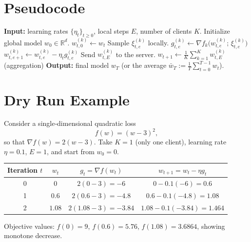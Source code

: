 \documentclass[11pt]{article}
\newcommand{\R}{\mathbb{R}}
\begin{document}
\section*{Pseudocode}
\begin{algorithm}[H]
\caption{Federated Averaging with $E$ Local SGD Steps}
\begin{algorithmic}[1]
\STATE \textbf{Input:} learning rates $\{\eta_t\}_{t\ge 0}$, local steps $E$, number of clients $K$.
\STATE Initialize global model $w_0\in\R^d$.
        \STATE $w_{t,0}^{(k)} \gets w_t$
            \STATE Sample $\xi_{t,e}^{(k)}$ locally.
            \STATE $g_{t,e}^{(k)} \gets \nabla f_k\big(w_{t,e}^{(k)};\,\xi_{t,e}^{(k)}\big)$
            \STATE $w_{t,e+1}^{(k)} \gets w_{t,e}^{(k)} - \eta_t g_{t,e}^{(k)}$
        \ENDFOR
        \STATE Send $w_{t,E}^{(k)}$ to the server.
    \ENDFOR
    \STATE $w_{t+1} \gets \frac{1}{K}\sum_{k=1}^{K} w_{t,E}^{(k)}$   \hfill (aggregation)
\ENDFOR
\STATE \textbf{Output:} final model $w_T$ (or the average $\bar w_T:=\frac1T\sum_{t=0}^{T-1}w_t$).
\end{algorithmic}
\end{algorithm}

\section*{Dry Run Example}
Consider a single‑dimensional quadratic loss
\[
f(w) = (w-3)^2 ,
\]
so that $\nabla f(w)=2(w-3)$.  
Take $K=1$ (only one client), learning rate $\eta=0.1$, $E=1$, and start from $w_0=0$.

\medskip
\begin{tabular}{c|c|c|c}
\textbf{Iteration $t$} & $w_t$ & $g_t=\nabla f(w_t)$ & $w_{t+1}=w_t-\eta g_t$ \\ \hline
0 & $0$ & $2(0-3)=-6$ & $0-0.1(-6)=0.6$ \\
1 & $0.6$ & $2(0.6-3)=-4.8$ & $0.6-0.1(-4.8)=1.08$ \\
2 & $1.08$ & $2(1.08-3)=-3.84$ & $1.08-0.1(-3.84)=1.464$ \\
\end{tabular}

Objective values: $f(0)=9$, $f(0.6)=5.76$, $f(1.08)=3.6864$, showing monotone decrease.

\newpage
\end{document}

